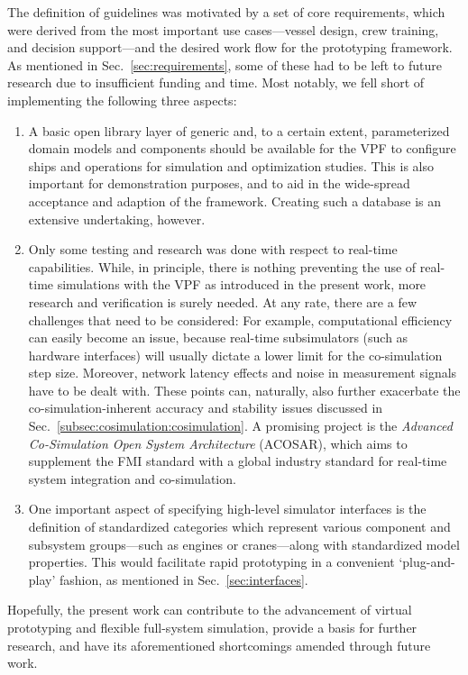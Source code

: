 \documentclass[prb,aps,showpacs,floatfix,twocolumn,10pt]{revtex4-1}
\newcommand{\sub}{subsimulator}
\theoremstyle{plain}
\theoremstyle{remark}
\begin{document}
The definition of guidelines was motivated by a set of core requirements, which were derived from the most important use cases---vessel design, crew training, and decision support---and the desired work flow for the prototyping framework.
As mentioned in Sec.~\ref{sec:requirements}, some of these had to be left to future research due to insufficient funding and time.
Most notably, we fell short of implementing the following three aspects:
\begin{enumerate}
	\item A basic open library layer of generic and, to a certain extent, parameterized domain models and components should be available for the VPF to configure ships and operations for simulation and optimization studies.
	This is also important for demonstration purposes, and to aid in the wide-spread acceptance and adaption of the framework.
	Creating such a database is an extensive undertaking, however.
	\item Only some testing and research\cite{Skjong2017b} was done with respect to real-time capabilities.
	While, in principle, there is nothing preventing the use of real-time simulations with the VPF as introduced in the present work, more research and verification is surely needed.
	At any rate, there are a few challenges that need to be considered:
	For example, computational efficiency can easily become an issue, because real-time \sub{}s (such as hardware interfaces) will usually dictate a lower limit for the co-simulation step size.
	Moreover, network latency effects and noise in measurement signals have to be dealt with.
	These points can, naturally, also further exacerbate the co-simulation-inherent accuracy and stability issues discussed in Sec.~\ref{subsec:cosimulation:cosimulation}.
	A promising project is the \emph{Advanced Co-Simulation Open System Architecture}\cite{ACOSAR-website} (ACOSAR), which aims to supplement the FMI standard with a global industry standard for real-time system integration and co-simulation.
	\item One important aspect of specifying high-level simulator interfaces is the definition of standardized categories which represent various component and subsystem groups---such as engines or cranes---along with standardized model properties.
	This would facilitate rapid prototyping in a convenient `plug-and-play' fashion, as mentioned in Sec.~\ref{sec:interfaces}.
\end{enumerate}
Hopefully, the present work can contribute to the advancement of virtual prototyping and flexible full-system simulation, provide a basis for further research, and have its aforementioned shortcomings amended through future work.
\end{document}
